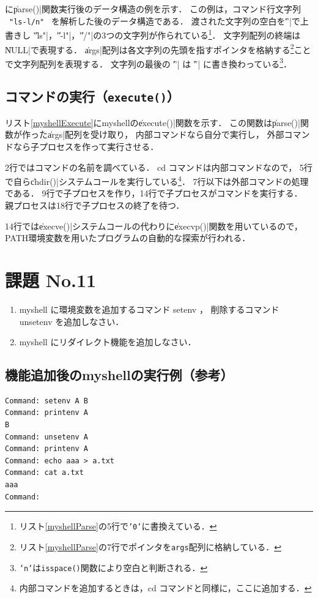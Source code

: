 に\|parse()|関数実行後のデータ構造の例を示す．
この例は，コマンド行文字列
~\texttt{"ls{\textvisiblespace}-l{\textvisiblespace}{\textvisiblespace}/{\bs}n"}~
を解析した後のデータ構造である．
渡された文字列の空白を\|'\0'|で上書きし
\|"ls"|，\|"-l"|，\|"/"|の3つの文字列が作られている\footnote{
  リスト\ref{myshellParse}の5行で\texttt{'{\bs}0'}に書換えている．}．
文字列配列の終端は\|NULL|で表現する．
\|args|配列は各文字列の先頭を指すポインタを格納する\footnote{
  リスト\ref{myshellParse}の7行でポインタを\texttt{args}配列に格納している．
}ことで文字列配列を表現する．
文字列の最後の \|'\n'| は \|'\0'| に書き換わっている\footnote{
  \texttt{'{\bs}n'}は\texttt{isspace()}関数により空白と判断される．
}．

\subsection{コマンドの実行（\texttt{execute()}）}
リスト\ref{myshellExecute}にmyshellの\|execute()|関数を示す．
この関数は\|parse()|関数が作った\|args|配列を受け取り，
内部コマンドなら自分で実行し，
外部コマンドなら子プロセスを作って実行させる．



2行ではコマンドの名前を調べている．
cd コマンドは内部コマンドなので，
5行で自ら\|chdir()|システムコールを実行している\footnote{
  内部コマンドを追加するときは，cd コマンドと同様に，ここに追加する．}．
7行以下は外部コマンドの処理である．
9行で子プロセスを作り，14行で子プロセスがコマンドを実行する．
親プロセスは18行で子プロセスの終了を待つ．

14行では\|execve()|システムコールの代わりに\|execvp()|関数を用いているので，
PATH環境変数を用いたプログラムの自動的な探索が行われる．

\newpage
\section*{課題 No.11}

\begin{enumerate}
\item myshell に環境変数を追加するコマンド setenv ，
  削除するコマンド unsetenv を追加しなさい．
\item myshell にリダイレクト機能を追加しなさい．
\end{enumerate}

\subsection*{機能追加後のmyshellの実行例（参考）}
\begin{lstlisting}[numbers=none]
Command: setenv A B
Command: printenv A
B
Command: unsetenv A
Command: printenv A
Command: echo aaa > a.txt
Command: cat a.txt
aaa
Command:
\end{lstlisting}
